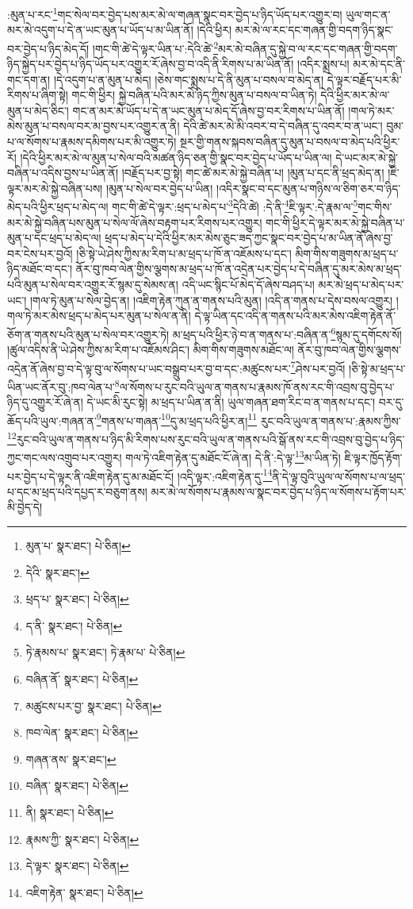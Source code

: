 :མུན་པ་རང་\footnote{མུན་པ་  སྣར་ཐང་།  པེ་ཅིན། }གང་སེལ་བར་བྱེད་པས་མར་མེ་ལ་གཞན་སྣང་བར་བྱེད་པ་ཉིད་ཡོད་པར་འགྱུར་བ། ཡུལ་གང་ན་མར་མེ་འདུག་པ་དེ་ན་ཡང་མུན་པ་ཡོད་པ་མ་ཡིན་ནོ། །དེའི་ཕྱིར། མར་མེ་ལ་རང་དང་གཞན་གྱི་བདག་ཉིད་སྣང་བར་བྱེད་པ་ཉིད་མེད་དོ། །གང་གི་ཚེ་དེ་ལྟར་ཡིན་པ་:དེའི་ཚེ་\footnote{དེའི་  སྣར་ཐང་། }མར་མེ་བཞིན་དུ་སྐྱེ་བ་ལ་རང་དང་གཞན་གྱི་བདག་ཉིད་སྐྱེད་པར་བྱེད་པ་ཉིད་ཡོད་པར་འགྱུར་རོ་ཞེས་བྱ་བ་འདི་ནི་རིགས་པ་མ་ཡིན་ནོ། །འདིར་སྨྲས་པ། མར་མེ་དང་ནི་གང་དག་ན། །དེ་འདུག་པ་ན་མུན་པ་མེད། །ཅེས་གང་སྨྲས་པ་དེ་ནི་མུན་པ་བསལ་བ་མེད་ན། དེ་ལྟར་བརྗོད་པར་མི་རིགས་པ་ཞིག་སྟེ། གང་གི་ཕྱིར། སྐྱེ་བཞིན་པའི་མར་མེ་ཉིད་ཀྱིས་མུན་པ་བསལ་བ་ཡིན་ཏེ། དེའི་ཕྱིར་མར་མེ་ལ་མུན་པ་མེད་ཅིང་། གང་ན་མར་མེ་ཡོད་པ་དེ་ན་ཡང་མུན་པ་མེད་དོ་ཞེས་བྱ་བར་རིགས་པ་ཡིན་ནོ། །གལ་ཏེ་མར་མེས་མུན་པ་བསལ་བར་མ་བྱས་པར་འགྱུར་ན་ནི། དེའི་ཚེ་མར་མེ་མི་འབར་བ་དེ་བཞིན་དུ་འབར་བ་ན་ཡང་། བུམ་པ་ལ་སོགས་པ་རྣམས་དམིགས་པར་མི་འགྱུར་ཏེ། སྔར་གྱི་གནས་སྐབས་བཞིན་དུ་མུན་པ་བསལ་བ་མེད་པའི་ཕྱིར་རོ། །དེའི་ཕྱིར་མར་མེ་ལ་མུན་པ་སེལ་བའི་མཚན་ཉིད་ཅན་གྱི་སྣང་བར་བྱེད་པ་ཡོད་པ་ཡིན་ལ། དེ་ཡང་མར་མེ་སྐྱེ་བཞིན་པ་འདིས་བྱས་པ་ཡིན་ནོ། །བརྗོད་པར་བྱ་སྟེ། གང་ཚེ་མར་མེ་སྐྱེ་བཞིན་པ། །མུན་པ་དང་ནི་ཕྲད་མེད་ན། །ཇི་ལྟར་མར་མེ་སྐྱེ་བཞིན་པས། །མུན་པ་སེལ་བར་བྱེད་པ་ཡིན། །འདིར་སྣང་བ་དང་མུན་པ་གཉིས་ལ་ཅིག་ཅར་བ་ཉིད་མེད་པའི་ཕྱིར་ཕྲད་པ་མེད་ལ། གང་གི་ཚེ་དེ་ལྟར་:ཕྲད་པ་མེད་པ་\footnote{ཕྲད་པ་  སྣར་ཐང་།  པེ་ཅིན། }དེའི་ཚེ། :དེ་ནི་\footnote{ད་ནི་  སྣར་ཐང་།  པེ་ཅིན། }ཇི་ལྟར་:དེ་རྣམ་ལ་\footnote{ཏེ་རྣམས་པ་  སྣར་ཐང་། ཏེ་རྣམ་པ་  པེ་ཅིན། }གང་གིས་མར་མེ་སྐྱེ་བཞིན་པས་མུན་པ་སེལ་ལོ་ཞེས་བརྟག་པར་རིགས་པར་འགྱུར། གང་གི་ཕྱིར་དེ་ལྟར་མར་མེ་སྐྱེ་བཞིན་པ་མུན་པ་དང་ཕྲད་པ་མེད་ལ། ཕྲད་པ་མེད་པ་དེའི་ཕྱིར་མར་མེས་ཅུང་ཟད་ཀྱང་སྣང་བར་བྱེད་པ་མ་ཡིན་ནོ་ཞེས་བྱ་བར་ངེས་པར་བྱའོ། །ཅི་སྟེ་ཡེ་ཤེས་ཀྱིས་མ་རིག་པ་མ་ཕྲད་པ་ཁོ་ན་འཇོམས་པ་དང་། མིག་གིས་གཟུགས་མ་ཕྲད་པ་ཉིད་མཐོང་བ་དང་། ནོར་བུ་ཁབ་ལེན་གྱིས་ལྕགས་མ་ཕྲད་པ་ཁོ་ན་འདྲེན་པར་བྱེད་པ་དེ་བཞིན་དུ་མར་མེས་མ་ཕྲད་པའི་མུན་པ་སེལ་བར་འགྱུར་རོ་སྙམ་དུ་སེམས་ན། འདི་ཡང་སྙིང་པོ་མེད་དོ་ཞེས་བཤད་པ། མར་མེ་ཕྲད་པ་མེད་པར་ཡང་། །གལ་ཏེ་མུན་པ་སེལ་བྱེད་ན། །འཇིག་རྟེན་ཀུན་ན་གནས་པའི་མུན། །འདི་ན་གནས་པ་དེས་བསལ་འགྱུར། །གལ་ཏེ་མར་མེས་ཕྲད་པ་མེད་པར་མུན་པ་སེལ་ན་ནི། དེ་ལྟ་ཡིན་དང་འདི་ན་གནས་པའི་མར་མེས་འཇིག་རྟེན་ནོ་ཅོག་ན་གནས་པའི་མུན་པ་སེལ་བར་འགྱུར་ཏེ། མ་ཕྲད་པའི་ཕྱིར་ཉེ་བ་ན་གནས་པ་:བཞིན་ན་\footnote{བཞིན་ནོ་  སྣར་ཐང་།  པེ་ཅིན། }སྙམ་དུ་དགོངས་སོ། །ཚུལ་འདིས་ནི་ཡེ་ཤེས་ཀྱིས་མ་རིག་པ་འཇོམས་ཤིང་། མིག་གིས་གཟུགས་མཐོང་ལ། ནོར་བུ་ཁབ་ལེན་གྱིས་ལྕགས་འདྲེན་ནོ་ཞེས་བྱ་བ་དེ་ལྟ་བུ་ལ་སོགས་པ་ཡང་བསྒྲུབ་པར་བྱ་བ་དང་:མཚུངས་པར་\footnote{མཚུངས་པར་བྱ་  སྣར་ཐང་།  པེ་ཅིན། }ཤེས་པར་བྱའོ། །ཅི་སྟེ་མ་ཕྲད་པ་ཡིན་ཡང་ནོར་བུ་:ཁབ་ལེན་པ་\footnote{ཁབ་ལེན་  སྣར་ཐང་།  པེ་ཅིན། }ལ་སོགས་པ་རུང་བའི་ཡུལ་ན་གནས་པ་རྣམས་ཁོ་ནས་རང་གི་འབྲས་བུ་བྱེད་པ་ཉིད་དུ་འགྱུར་རོ་ཞེ་ན། དེ་ཡང་མི་རུང་སྟེ། མ་ཕྲད་པ་ཡིན་ན་ནི། ཡུལ་གཞན་ཐག་རིང་བ་ན་གནས་པ་དང་། བར་དུ་ཆོད་པའི་ཡུལ་:གཞན་ན་\footnote{གཞན་ནས་  སྣར་ཐང་། }གནས་པ་གཞན་\footnote{བཞིན་  སྣར་ཐང་།  པེ་ཅིན། }དུ་མ་ཕྲད་པའི་ཕྱིར་ན།\footnote{ནི།  སྣར་ཐང་།  པེ་ཅིན། } རུང་བའི་ཡུལ་ན་གནས་པ་:རྣམས་ཀྱིས་\footnote{རྣམས་ཀྱི་  སྣར་ཐང་།  པེ་ཅིན། }རུང་བའི་ཡུལ་ན་གནས་པ་ཉིད་མི་རིགས་པས་རུང་བའི་ཡུལ་ན་གནས་པའི་སྒོ་ནས་རང་གི་འབྲས་བུ་བྱེད་པ་ཉིད་ཀྱང་གང་ལས་འགྲུབ་པར་འགྱུར། གལ་ཏེ་འཇིག་རྟེན་དུ་མཐོང་ངོ་ཞེ་ན། དེ་ནི་:དེ་ལྟ་\footnote{དེ་ལྟར་  སྣར་ཐང་།  པེ་ཅིན། }མ་ཡིན་ཏེ། ཇི་ལྟར་ཁྱོད་རྟོག་པར་བྱེད་པ་དེ་ལྟར་ནི་འཇིག་རྟེན་དུ་མ་མཐོང་ངོ། །འདི་ལྟར་:འཇིག་རྟེན་དུ་\footnote{འཇིག་རྟེན་  སྣར་ཐང་།  པེ་ཅིན། }ནི་དེ་ལྟ་བུའི་ཡུལ་ལ་སོགས་པ་ལ་ཕྲད་པ་དང་མ་ཕྲད་པའི་དཔྱད་ར་བཅུག་ནས། མར་མེ་ལ་སོགས་པ་རྣམས་ལ་སྣང་བར་བྱེད་པ་ཉིད་ལ་སོགས་པ་རྟོག་པར་མི་བྱེད་དེ། 